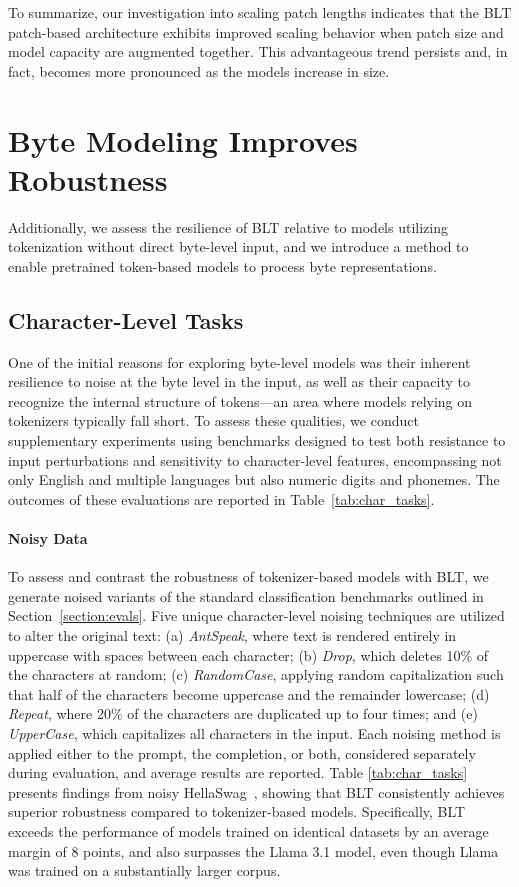 To summarize, our investigation into scaling patch lengths indicates that the {\textsc BLT} patch-based architecture exhibits improved scaling behavior when patch size and model capacity are augmented together. This advantageous trend persists and, in fact, becomes more pronounced as the models increase in size.

\section{Byte Modeling Improves Robustness} Additionally, we assess the resilience of {\textsc BLT} relative to models utilizing tokenization without direct byte-level input, and we introduce a method to enable pretrained token-based models to process byte representations.  
\label{sec:robustness}

\subsection{Character-Level Tasks}

One of the initial reasons for exploring byte-level models was their inherent resilience to noise at the byte level in the input, as well as their capacity to recognize the internal structure of tokens—an area where models relying on tokenizers typically fall short. To assess these qualities, we conduct supplementary experiments using benchmarks designed to test both resistance to input perturbations and sensitivity to character-level features, encompassing not only English and multiple languages but also numeric digits and phonemes. The outcomes of these evaluations are reported in Table~\ref{tab:char_tasks}.

\paragraph{Noisy Data} To assess and contrast the robustness of tokenizer-based models with {\textsc BLT}, we generate noised variants of the standard classification benchmarks outlined in Section~\ref{section:evals}. Five unique character-level noising techniques are utilized to alter the original text: (a) \textit{AntSpeak}, where text is rendered entirely in uppercase with spaces between each character; (b) \textit{Drop}, which deletes 10\% of the characters at random; (c) \textit{RandomCase}, applying random capitalization such that half of the characters become uppercase and the remainder lowercase; (d) \textit{Repeat}, where 20\% of the characters are duplicated up to four times; and (e) \textit{UpperCase}, which capitalizes all characters in the input. Each noising method is applied either to the prompt, the completion, or both, considered separately during evaluation, and average results are reported. Table \ref{tab:char_tasks} presents findings from noisy HellaSwag~\citep{Eval_hellaswag}, showing that {\textsc BLT} consistently achieves superior robustness compared to tokenizer-based models. Specifically, {\textsc BLT} exceeds the performance of models trained on identical datasets by an average margin of 8 points, and also surpasses the Llama 3.1 model, even though Llama was trained on a substantially larger corpus.


